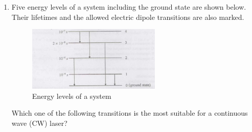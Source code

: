 \documentclass[14pt, a4paper]{extarticle}
\begin{document}
\begin{enumerate}[label=\textbf{Q. \arabic*}, start=21]
\begin{enumerate}[label=(\Alph*)]
\end{enumerate}

\vspace{12em}

\item Five energy levels of a system including the ground state are shown below.
Their lifetimes and the allowed electric dipole transitions are also marked.
\begin{figure}[H]
\centering
\includegraphics[width=0.6\textwidth]{figs/Q31fig.png}
\caption{Energy levels of a system}
\label{fig:q31}
\end{figure}
Which one of the following transitions is the most suitable for a continuous wave (CW) laser?
\begin{enumerate}[label=(\Alph*)]
\end{enumerate}


\end{enumerate}
\end{document}
